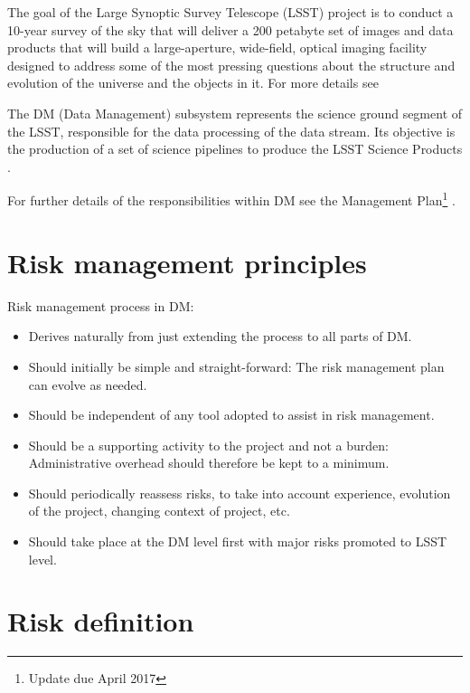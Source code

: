 \documentclass[toc,DM,lsstdraft,PL]{lsstdoc}
\begin{document}
The goal of the Large Synoptic Survey Telescope (LSST) project is to conduct a 10-year survey of the sky that will deliver a 200 petabyte set of images and data products that will build a large-aperture, wide-field, optical imaging facility designed to address some of the most pressing questions about the structure and evolution of the universe and the objects in it.  For more details see 

The DM (Data Management) subsystem represents the science ground segment of the LSST, responsible for the data processing of the data stream. Its objective is the production of a set of science pipelines to produce the LSST Science Products .

For further details of the responsibilities within DM see the Management Plan\footnote{Update due April 2017} .


\newpage

\section{Risk management principles \label{sect:principles}}

Risk management process in DM:
\begin{itemize}
\item Derives naturally from  just extending the process to all parts of DM.
\item Should initially be simple and straight-forward: The risk management plan can evolve as needed.
\item Should be independent of any tool adopted to assist in risk management.
\item Should be a supporting activity to the project and not a burden: Administrative overhead should therefore be kept to a minimum.
\item Should periodically reassess risks, to take into account experience, evolution of the project, changing context of project, etc.
\item Should take place at the DM level first with major risks promoted to LSST level.
\end{itemize}


\section{Risk definition \label{sect:definition}}




\end{document}
